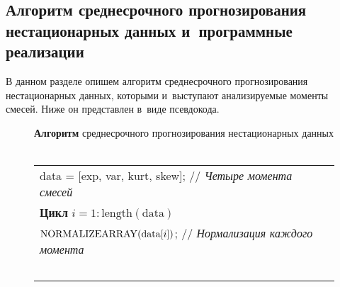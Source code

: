 \begin{multicols}{2}
\section{Алгоритм среднесрочного прогнозирования нестационарных данных 
и~программные реализации}

В данном разделе опишем алгоритм среднесрочного прогнозирования 
нестационарных данных, которыми и~выступают анализируемые моменты смесей. 
Ниже он представлен в~виде псевдокода.
{ %

}

\renewcommand{\figurename}{\protect\bf Алгоритм}

\begin{figure*}
{\small \begin{center}
\textbf{Алгоритм} среднесрочного прогнозирования нестационарных данных\\
{\ }\\[-6pt]
\begin{tabular}{l}
\hline
data = [exp, var, kurt, skew]; //  \textit{Четыре момента смесей}\\
\textbf{Цикл} $i = 1:\mathrm{length(data)}$\\
\hspace*{3mm}$\mathrm{NORMALIZE\mbox{\normalsize A}RRAY}(\mathrm{data}[i])$; // \textit{Нормализация каждого момента}\\
\ \\


\end{tabular}
\end{center}}
\end{figure*}
\end{multicols}
